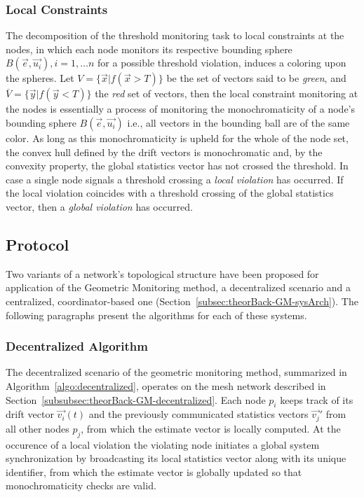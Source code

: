 \newpage

\subsubsection{Local Constraints} \label{subsubsec:theorBack-GM-localConstraints}

The decomposition of the threshold monitoring task to local constraints at the nodes, in which each node monitors its respective bounding sphere $B(\vec{e}, \vec{u_i}), i=1,\dots n$ for a possible threshold violation, induces a coloring upon the spheres. Let $V=\{\vec{x} | f(\vec{x}>T)\}$ be the set of vectors said to be \emph{green}, and $\overline{V}=\{\vec{y} | f(\vec{y}<T)\}$ the \emph{red} set of vectors, then the local constraint monitoring at the nodes is essentially a process of monitoring the monochromaticity of a node's bounding sphere $B(\vec{e}, \vec{u_i})$ i.e., all vectors in the bounding ball are of the same color. As long as this monochromaticity is upheld for the whole of the node set, the convex hull defined by the drift vectors is monochromatic and, by the convexity property, the global statistics vector has not crossed the threshold. In case a single node signals a threshold crossing a \emph{local violation} has occurred. If the local violation coincides with a threshold crossing of the global statistics vector, then a \emph{global violation} has occurred.

\subsection{Protocol} \label{subsec:theorBack-GM-protocol}

Two variants of a network's topological structure have been proposed for application of the Geometric Monitoring method, a decentralized scenario and a centralized, coordinator-based one (Section~\ref{subsec:theorBack-GM-sysArch}). The following paragraphs present the algorithms for each of these systems.

\subsubsection{Decentralized Algorithm} \label{subsubsec:theorBack-GM-decentralizedAlgo}

The decentralized scenario of the geometric monitoring method, summarized in Algorithm~\ref{algo:decentralized}, operates on the mesh network described in Section~\ref{subsubsec:theorBack-GM-decentralized}. Each node $p_i$ keeps track of its drift vector $\vec{v_i}(t)$ and the previously communicated statistics vectors $\vec{v_j}'$ from all other nodes $p_j$, from which the estimate vector is locally computed. At the occurence of a local violation the violating node initiates a global system synchronization by broadcasting its local statistics vector along with its unique identifier, from which the estimate vector is globally updated so that monochromaticity checks are valid.\\ 

